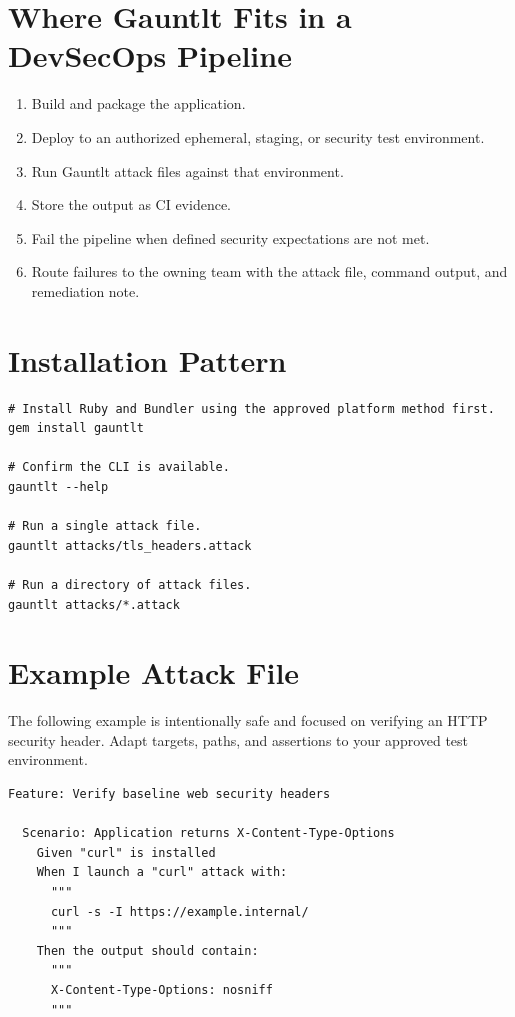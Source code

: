 \documentclass[11pt]{article}
\begin{document}
\section{Where Gauntlt Fits in a DevSecOps Pipeline}
\begin{enumerate}
  \item Build and package the application.
  \item Deploy to an authorized ephemeral, staging, or security test environment.
  \item Run Gauntlt attack files against that environment.
  \item Store the output as CI evidence.
  \item Fail the pipeline when defined security expectations are not met.
  \item Route failures to the owning team with the attack file, command output, and remediation note.
\end{enumerate}

\section{Installation Pattern}
\begin{verbatim}
# Install Ruby and Bundler using the approved platform method first.
gem install gauntlt

# Confirm the CLI is available.
gauntlt --help

# Run a single attack file.
gauntlt attacks/tls_headers.attack

# Run a directory of attack files.
gauntlt attacks/*.attack
\end{verbatim}

\section{Example Attack File}
The following example is intentionally safe and focused on verifying an HTTP security header. Adapt targets, paths, and assertions to your approved test environment.

\begin{verbatim}
Feature: Verify baseline web security headers

  Scenario: Application returns X-Content-Type-Options
    Given "curl" is installed
    When I launch a "curl" attack with:
      """
      curl -s -I https://example.internal/
      """
    Then the output should contain:
      """
      X-Content-Type-Options: nosniff
      """
\end{verbatim}
\end{document}
